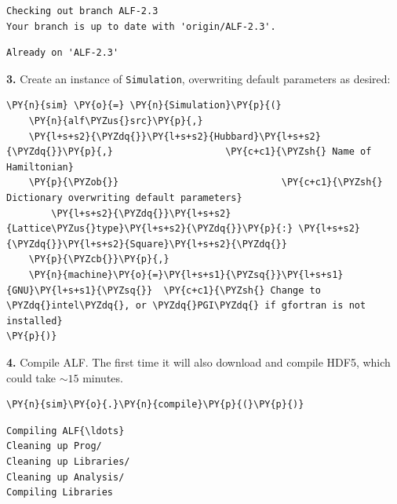     \begin{Verbatim}[commandchars=\\\{\}]
Checking out branch ALF-2.3
Your branch is up to date with 'origin/ALF-2.3'.
    \end{Verbatim}

    \begin{Verbatim}[commandchars=\\\{\}]
Already on 'ALF-2.3'
    \end{Verbatim}

    \textbf{3.} Create an instance of \texttt{Simulation}, overwriting
default parameters as desired:

    \begin{tcolorbox}[breakable, size=fbox, boxrule=1pt, pad at break*=1mm,colback=cellbackground, colframe=cellborder]
\begin{Verbatim}[commandchars=\\\{\}]
\PY{n}{sim} \PY{o}{=} \PY{n}{Simulation}\PY{p}{(}
    \PY{n}{alf\PYZus{}src}\PY{p}{,}
    \PY{l+s+s2}{\PYZdq{}}\PY{l+s+s2}{Hubbard}\PY{l+s+s2}{\PYZdq{}}\PY{p}{,}                    \PY{c+c1}{\PYZsh{} Name of Hamiltonian}
    \PY{p}{\PYZob{}}                             \PY{c+c1}{\PYZsh{} Dictionary overwriting default parameters}
        \PY{l+s+s2}{\PYZdq{}}\PY{l+s+s2}{Lattice\PYZus{}type}\PY{l+s+s2}{\PYZdq{}}\PY{p}{:} \PY{l+s+s2}{\PYZdq{}}\PY{l+s+s2}{Square}\PY{l+s+s2}{\PYZdq{}}
    \PY{p}{\PYZcb{}}\PY{p}{,}
    \PY{n}{machine}\PY{o}{=}\PY{l+s+s1}{\PYZsq{}}\PY{l+s+s1}{GNU}\PY{l+s+s1}{\PYZsq{}}  \PY{c+c1}{\PYZsh{} Change to \PYZdq{}intel\PYZdq{}, or \PYZdq{}PGI\PYZdq{} if gfortran is not installed}
\PY{p}{)}
\end{Verbatim}
\end{tcolorbox}

    \textbf{4.} Compile ALF. The first time it will also download and
compile HDF5, which could take \(\sim15\) minutes.

    \begin{tcolorbox}[breakable, size=fbox, boxrule=1pt, pad at break*=1mm,colback=cellbackground, colframe=cellborder]
\begin{Verbatim}[commandchars=\\\{\}]
\PY{n}{sim}\PY{o}{.}\PY{n}{compile}\PY{p}{(}\PY{p}{)}
\end{Verbatim}
\end{tcolorbox}

    \begin{Verbatim}[commandchars=\\\{\}]
Compiling ALF{\ldots}
Cleaning up Prog/
Cleaning up Libraries/
Cleaning up Analysis/
Compiling Libraries
    \end{Verbatim}

